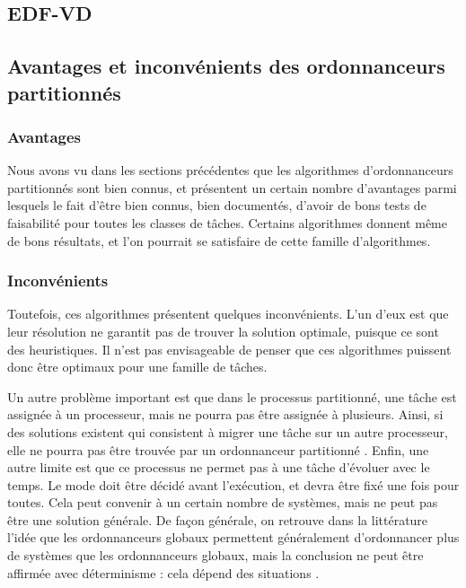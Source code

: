 \documentclass[11pt,a4paper,oneside]{report}
\begin{document}
\subsection{EDF-VD}


\subsection{Avantages et inconvénients des ordonnanceurs partitionnés}
\subsubsection{Avantages}
Nous avons vu dans les sections précédentes que les algorithmes d'ordonnanceurs 
partitionnés sont bien connus, et présentent un certain nombre d'avantages parmi lesquels 
le fait d'être bien connus, bien documentés, d'avoir de bons tests de faisabilité pour 
toutes les classes de tâches. 
Certains algorithmes donnent même de bons résultats, et l'on pourrait se satisfaire de 
cette famille d'algorithmes.\\

\subsubsection{Inconvénients}
Toutefois, ces algorithmes présentent quelques inconvénients. 
L'un d'eux est que leur résolution ne garantit pas de trouver la solution optimale, 
puisque ce sont des heuristiques. Il n'est pas envisageable de penser 
que ces algorithmes puissent donc être optimaux pour une famille de tâches.

Un autre problème important est que dans le processus partitionné, une tâche est 
assignée à un processeur, mais ne pourra pas être assignée à plusieurs. Ainsi, si des solutions 
existent qui consistent à migrer une tâche sur un autre processeur, elle ne pourra pas être trouvée 
par un ordonnanceur partitionné \cite{ramamurthy_static-priority_2000}. 
Enfin, une autre limite est que ce processus ne permet pas à une tâche d'évoluer avec le temps. 
Le mode doit être décidé avant l'exécution, et devra être fixé une fois pour toutes. 
Cela peut convenir à un certain nombre de systèmes, mais ne peut pas être une solution générale.
De façon générale, on retrouve dans la littérature l'idée que les ordonnanceurs globaux 
permettent généralement d'ordonnancer plus de systèmes que les ordonnanceurs globaux, 
mais la conclusion ne peut être affirmée avec déterminisme : cela dépend des situations
\cite{lopez_utilization_2004}.\\
\end{document}
